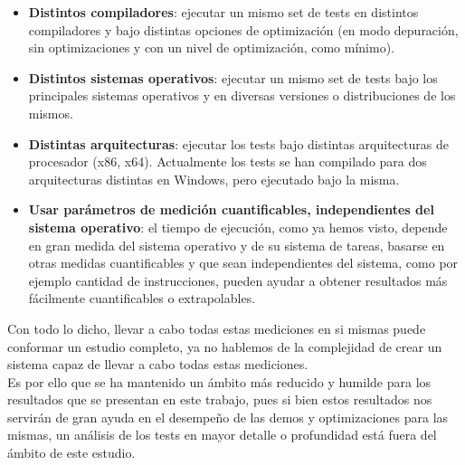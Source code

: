 \begin{itemize}
	\item \textbf{Distintos compiladores}: ejecutar un mismo set de tests en distintos compiladores y bajo distintas opciones de optimización (en modo depuración, sin optimizaciones y con un nivel de optimización, como mínimo).
	\item \textbf{Distintos sistemas operativos}: ejecutar un mismo set de tests bajo los principales sistemas operativos y en diversas versiones o distribuciones de los mismos.
	\item \textbf{Distintas arquitecturas}: ejecutar los tests bajo distintas arquitecturas de procesador (x86, x64). Actualmente los tests se han compilado para dos arquitecturas distintas en Windows, pero ejecutado bajo la misma.
	\item \textbf{Usar parámetros de medición cuantificables, independientes del sistema operativo}: el tiempo de ejecución, como ya hemos visto, depende en gran medida del sistema operativo y de su sistema de tareas, basarse en otras medidas cuantificables y que sean independientes del sistema, como por ejemplo cantidad de instrucciones, pueden ayudar a obtener resultados más fácilmente cuantificables o extrapolables.
\end{itemize} 

Con todo lo dicho, llevar a cabo todas estas mediciones en si mismas puede conformar un estudio completo, ya no hablemos de la complejidad de crear un sistema capaz de llevar a cabo todas estas mediciones.\\

Es por ello que se ha mantenido un ámbito más reducido y humilde para los resultados que se presentan en este trabajo, pues si bien estos resultados nos servirán de gran ayuda en el desempeño de las demos y optimizaciones para las mismas, un análisis de los tests en mayor detalle o profundidad está fuera del ámbito de este estudio.